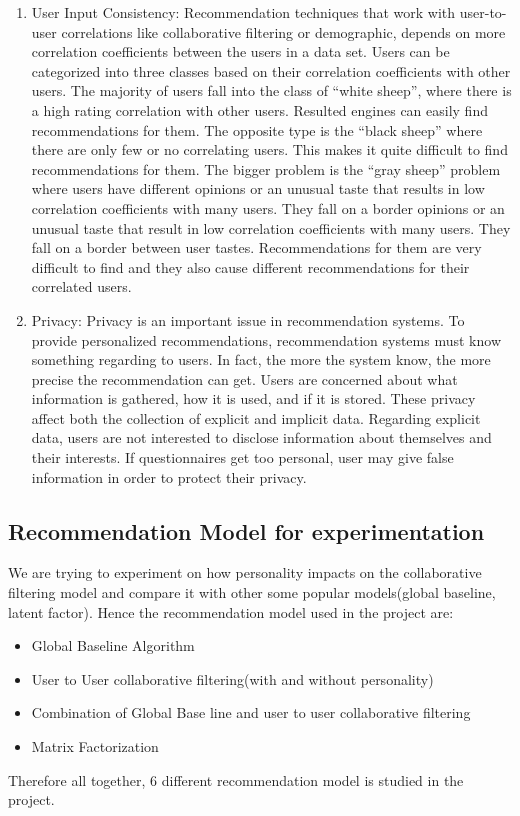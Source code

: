 \begin{enumerate}
\item User Input Consistency: Recommendation techniques that work with user-to-user correlations like collaborative filtering or demographic, depends on more correlation coefficients between the users in a data set. Users can be categorized into three classes based on their correlation coefficients with other users. The majority of users fall into the class of ``white sheep'', where there is a high rating correlation with other users. Resulted engines can easily find recommendations for them. The opposite type is the ``black sheep'' where there are only few or no correlating users. This makes it quite difficult to find recommendations for them. The bigger problem is the ``gray sheep'' problem where users have different opinions or an unusual taste that results in low correlation coefficients with many users. They fall on a border opinions or an unusual taste that result in low correlation coefficients with many users. They fall on a border between user tastes. Recommendations for them are very difficult to find and they also cause different recommendations for their correlated users.
\item Privacy: Privacy is an important issue in recommendation systems. To provide personalized recommendations, recommendation systems must know something regarding to users. In fact, the more the system know, the more precise the recommendation can get. Users are concerned about what information is gathered, how it is used, and if it is stored. These privacy affect both the collection of explicit and implicit data. Regarding explicit data, users are not interested to disclose information about themselves and their interests. If questionnaires get too personal, user may give false information in order to protect their privacy.
\end{enumerate}
\subsection{Recommendation Model for experimentation}
We are trying to experiment on how personality impacts on the collaborative filtering model and compare it with other some popular models(global baseline, latent factor).
Hence the recommendation model used in the project are:
\begin{itemize}
\item Global Baseline Algorithm
\item User to User collaborative filtering(with and without personality)
\item Combination of Global Base line and user to user collaborative filtering
\item Matrix Factorization
\end{itemize}
Therefore all together, 6 different recommendation model is studied in the project.

